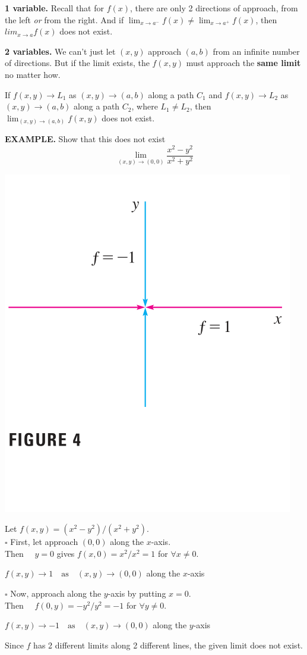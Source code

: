 \documentclass{article}
\begin{document}
  \textbf{1 variable.}   Recall that for $f(x)$, there are only 2 directions of approach, from the left \textit{or} from the right. And if $\lim_{x \to a^{-}} f(x) \ne \lim_{x \to a^{+}} f(x)$, then $lim_{x \to a} f(x)$ does not exist.

  \textbf{2 variables.} We can't just let $(x,y)$ approach $(a,b)$ from an infinite number of directions. But if the limit exists, the $f(x,y)$ must approach the \textbf{same limit} no matter how. 
  \begin{mdframed}
    If $f(x,y) \to L_1$ as $(x,y) \to (a,b)$ along a path $C_1$ and $f(x,y) \to L_2$ as $(x,y) \to (a,b)$ along a path $C_2$, where $L_1 \ne L_2$, then $\lim_{(x,y) \to (a,b)} f(x,y)$ does not exist.
  \end{mdframed}
  {\selectfont \textbf{\textcolor{blue5}{EXAMPLE.}}} Show that  this does not exist \[\lim_{(x,y) \to (0,0)} \frac{x^2 - y^2 }{x^2 + y^2 }\]

  \begin{minipage}[]{0.35\textwidth}
    \begin{center}
      \includegraphics[width = 5 cm]{./images/limeg1.png} 
    \end{center}
  \end{minipage}
  \begin{minipage}[]{0.6\textwidth}
    Let $f(x,y) = (x^2 - y^2 )/(x^2 + y^2 )$. \\ $\square$ First, let approach $(0,0)$ along the $x$-axis.\\
    Then $\quad y = 0$ gives $f(x,0) = x^2 / x^2 = 1$ for $\forall x \ne 0$.
    \begin{center}
    $f(x,y) \to 1  \quad \text{as} \quad (x,y) \to (0,0)$ along the $x$-axis
    \end{center}  
    $\square$ Now, approach along the $y$-axis by putting $x = 0$.\\
    Then $\quad f(0,y) = -y^2 / y^2 = -1$ for $\forall y \ne 0$.
    \begin{center}
      $f(x,y) \to -1 \quad \text{as} \quad (x,y) \to (0,0)$ along the $y$-axis
    \end{center}
    Since $f$ has 2 different limits along 2 different lines, the given limit does not exist.
  \end{minipage}
\end{document}
